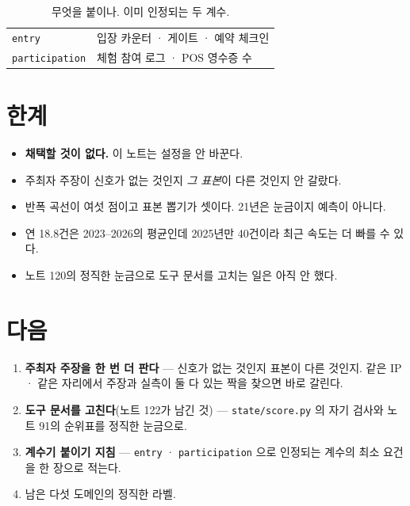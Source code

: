 \documentclass[10pt]{article}
\begin{document}

\begin{table}[t]
\centering\tsize
\caption{무엇을 붙이나. 이미 인정되는 두 계수.}
\begin{tabular}{ll}
\toprule
\texttt{entry} & 입장 카운터 · 게이트 · 예약 체크인 \\
\texttt{participation} & 체험 참여 로그 · POS 영수증 수 \\
\bottomrule
\end{tabular}
\end{table}

\section{한계}

\begin{itemize}[leftmargin=1.1em,itemsep=0.15em]
\item \textbf{채택할 것이 없다.} 이 노트는 설정을 안 바꾼다.
\item 주최자 주장이 신호가 없는 것인지 \emph{그 표본}이 다른 것인지 안 갈랐다.
\item 반폭 곡선이 여섯 점이고 표본 뽑기가 셋이다. 21년은 눈금이지 예측이
      아니다.
\item 연 18.8건은 2023--2026의 평균인데 2025년만 40건이라 최근 속도는 더
      빠를 수 있다.
\item 노트 120의 정직한 눈금으로 도구 문서를 고치는 일은 아직 안 했다.
\end{itemize}

\section{다음}

\begin{enumerate}[leftmargin=1.3em,itemsep=0.15em]
\item \textbf{주최자 주장을 한 번 더 판다} --- 신호가 없는 것인지 표본이
      다른 것인지. 같은 IP · 같은 자리에서 주장과 실측이 둘 다 있는 짝을
      찾으면 바로 갈린다.
\item \textbf{도구 문서를 고친다}(노트 122가 남긴 것) --- \texttt{state/score.py}
      의 자기 검사와 노트 91의 순위표를 정직한 눈금으로.
\item \textbf{계수기 붙이기 지침} --- \texttt{entry} · \texttt{participation}
      으로 인정되는 계수의 최소 요건을 한 장으로 적는다.
\item 남은 다섯 도메인의 정직한 라벨.
\end{enumerate}
\end{document}
